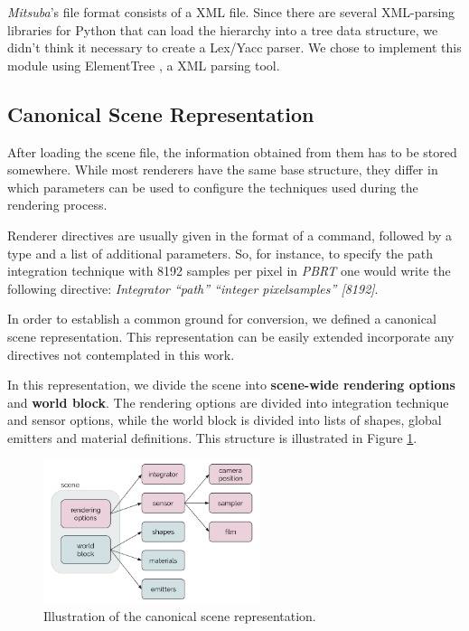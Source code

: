 \textit{Mitsuba}'s file format consists of a XML file. Since there are several 
XML-parsing libraries for Python that can load the hierarchy into a tree data 
structure, we didn't think it necessary to create a Lex/Yacc parser. We chose to 
implement this module using ElementTree \cite{ET}, a XML parsing tool.

\subsection{Canonical Scene Representation}
After loading the scene file, the information obtained from them has to be 
stored somewhere. While most renderers have the same base structure, they differ 
in which parameters can be used to configure the techniques used during the 
rendering process. 

Renderer directives are usually given in the format of a command, followed by a 
type and a list of additional parameters. So, for instance, to specify the path 
integration technique with 8192 samples per pixel in \textit{PBRT} one would 
write the following directive: \textit{Integrator ``path'' ``integer 
pixelsamples'' [8192]}.

In order to establish a common ground for conversion, we 
defined a canonical scene representation. This representation can be easily 
extended incorporate any directives not contemplated in this work.

In this representation, we divide the scene into \textbf{scene-wide rendering 
options} and \textbf{world block}. The rendering options are divided into 
integration technique and sensor options, while the world block is divided into 
lists of shapes, global emitters and material definitions. This structure is 
illustrated in Figure \ref{fig:canonicalrep}.

\begin{figure}[h]
\centering
\includegraphics[width=2.5in]{figs/3_system_architecture/canonicalrep.png}
\caption{Illustration of the canonical scene representation.}
\label{fig:canonicalrep}
\end{figure}

